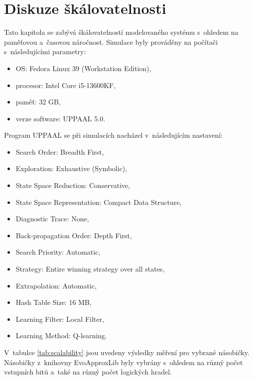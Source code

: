 \chapter{Diskuze škálovatelnosti} 
\label{skalovatelnost}
Tato kapitola se zabývá škálovatelností modelovaného systému s~ohledem na paměťovou a~časovou náročnost. Simulace byly prováděny na počítači s~následujícími parametry:
\begin{itemize}
    \item OS: Fedora Linux 39 (Workstation Edition),
    \item procesor: Intel Core i5-13600KF,
    \item paměť: 32 GB,
    \item verze software: UPPAAL 5.0.
\end{itemize}
Program UPPAAL se při simulacích nacházel v~následujícím nastavení:
\begin{itemize}
    \item Search Order: Breadth First,
    \item Exploration: Exhaustive (Symbolic),
    \item State Space Reduction: Conservative,
    \item State Space Representation: Compact Data Structure,
    \item Diagnostic Trace: None,
    \item Back-propagation Order: Depth First,
    \item Search Priority: Automatic,
    \item Strategy: Entire winning strategy over all states,
    \item Extrapolation: Automatic,
    \item Hash Table Size: 16 MB,
    \item Learning Filter: Local Filter,
    \item Learning Method: Q-learning.
\end{itemize}
\pagebreak
V~tabulce \ref{tab:scalability} jsou uvedeny výsledky měření pro vybrané násobičky. Násobičky z~knihovny EvoApproxLib byly vybrány s~ohledem na různý počet vstupních bitů a~také na různý počet logických hradel. 

